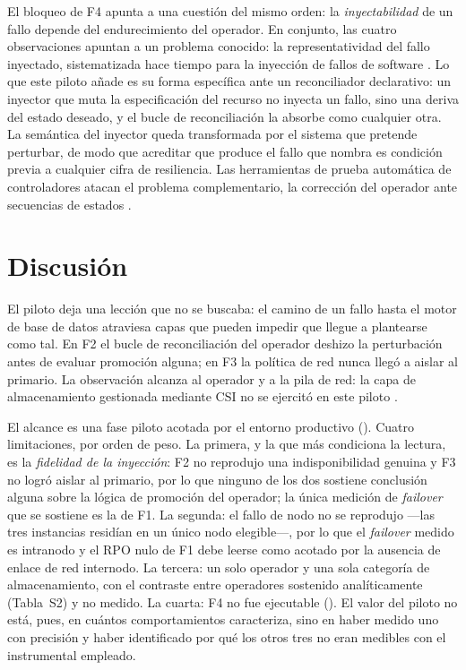 El bloqueo de F4 apunta a una cuestión del mismo orden: la \textit{inyectabilidad} de un fallo depende del endurecimiento del operador. En conjunto, las cuatro observaciones apuntan a un problema conocido: la representatividad del fallo inyectado, sistematizada hace tiempo para la inyección de fallos de software \citep{natella2016}. Lo que este piloto añade es su forma específica ante un reconciliador declarativo: un inyector que muta la especificación del recurso no inyecta un fallo, sino una deriva del estado deseado, y el bucle de reconciliación la absorbe como cualquier otra. La semántica del inyector queda transformada por el sistema que pretende perturbar, de modo que acreditar que produce el fallo que nombra es condición previa a cualquier cifra de resiliencia. Las herramientas de prueba automática de controladores atacan el problema complementario, la corrección del operador ante secuencias de estados \citep{sun2022,gu2023}.


\section{Discusión}\label{sec:disc}
El piloto deja una lección que no se buscaba: el camino de un fallo hasta el motor de base de datos atraviesa capas que pueden impedir que llegue a plantearse como tal. En F2 el bucle de reconciliación del operador deshizo la perturbación antes de evaluar promoción alguna; en F3 la política de red nunca llegó a aislar al primario. La observación alcanza al operador y a la pila de red: la capa de almacenamiento gestionada mediante CSI no se ejercitó en este piloto \citep{avizienis2004}.

El alcance es una fase piloto acotada por el entorno productivo (). Cuatro limitaciones, por orden de peso. La primera, y la que más condiciona la lectura, es la \textit{fidelidad de la inyección}: F2 no reprodujo una indisponibilidad genuina y F3 no logró aislar al primario, por lo que ninguno de los dos sostiene conclusión alguna sobre la lógica de promoción del operador; la única medición de \textit{failover} que se sostiene es la de F1. La segunda: el fallo de nodo no se reprodujo —las tres instancias residían en un único nodo elegible—, por lo que el \textit{failover} medido es intranodo y el RPO nulo de F1 debe leerse como acotado por la ausencia de enlace de red internodo. La tercera: un solo operador y una sola categoría de almacenamiento, con el contraste entre operadores sostenido analíticamente (Tabla~S2) y no medido. La cuarta: F4 no fue ejecutable (). El valor del piloto no está, pues, en cuántos comportamientos caracteriza, sino en haber medido uno con precisión y haber identificado por qué los otros tres no eran medibles con el instrumental empleado.

